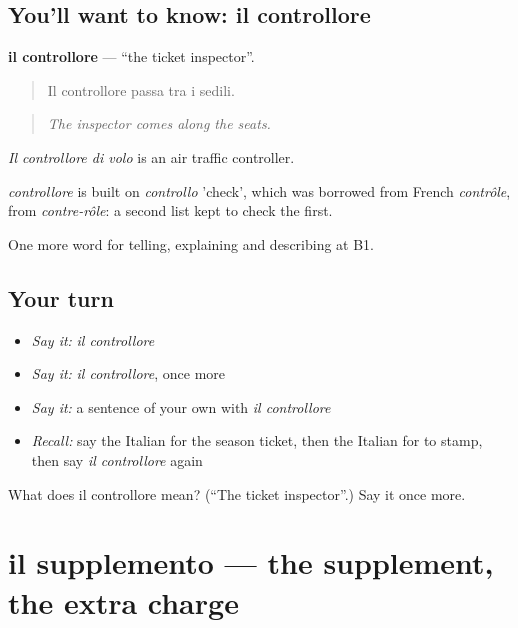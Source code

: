 \subsection*{You'll want to know: il controllore}
\textbf{il controllore} — \textquotedblleft{}the ticket inspector\textquotedblright{}.

\begin{quote}
Il controllore passa tra i sedili.
\end{quote}

\begin{quote}
\emph{The inspector comes along the seats.}
\end{quote}

\emph{Il controllore di volo} is an air traffic controller.

\begin{cousinweb}
\emph{controllore} is built on \emph{controllo} 'check', which was borrowed from French \emph{contrôle}, from \emph{contre-rôle}: a second list kept to check the first.
\end{cousinweb}

\begin{grammarlens}[title={What you've built}]
One more word for telling, explaining and describing at B1.
\end{grammarlens}

\subsection*{Your turn}
\begin{itemize}
\raggedright
  \item \emph{Say it:} \emph{il controllore}
  \item \emph{Say it:} \emph{il controllore}, once more
  \item \emph{Say it:} a sentence of your own with \emph{il controllore}
  \item \emph{Recall:} say the Italian for the season ticket, then the Italian for to stamp, then say \emph{il controllore} again
\end{itemize}

\begin{tcolorbox}[breakable,colback=teal!4,colframe=teal!35!black,title={Before you move on}]
What does il controllore mean? (\textquotedblleft{}The ticket inspector\textquotedblright{}.) Say it once more.
\end{tcolorbox}
\section[il supplemento]{il supplemento — the supplement, the extra charge}

